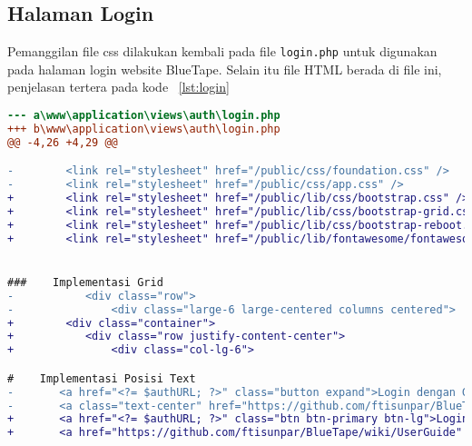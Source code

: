 \subsection{Halaman Login}
Pemanggilan file css dilakukan kembali pada file \texttt{login.php} untuk digunakan pada halaman login website BlueTape. Selain itu file HTML berada di file ini, penjelasan tertera pada kode ~\ref{lst:login}
\begin{lstlisting}[language=diff, caption=Perubahan file \path{\views\auth\login.php},  basicstyle=\ttfamily, frame=single,
columns=fullflexible, keepspaces=true, breaklines=true, label={lst:login}]
--- a\www\application\views\auth\login.php	
+++ b\www\application\views\auth\login.php	
@@ -4,26 +4,29 @@

-        <link rel="stylesheet" href="/public/css/foundation.css" />
-        <link rel="stylesheet" href="/public/css/app.css" />
+        <link rel="stylesheet" href="/public/lib/css/bootstrap.css" />
+        <link rel="stylesheet" href="/public/lib/css/bootstrap-grid.css" />
+        <link rel="stylesheet" href="/public/lib/css/bootstrap-reboot.css" />
+        <link rel="stylesheet" href="/public/lib/fontawesome/fontawesome.css" />


###    Implementasi Grid
-        	<div class="row">
-        		<div class="large-6 large-centered columns centered">
+        <div class="container">
+        	<div class="row justify-content-center">
+        		<div class="col-lg-6">

#    Implementasi Posisi Text
- 		<a href="<?= $authURL; ?>" class="button expand">Login dengan Google</a><br/><br/>
- 		<a class="text-center" href="https://github.com/ftisunpar/BlueTape/wiki/UserGuide" target="_blank">Petunjuk Penggunaan</a>
+ 		<a href="<?= $authURL; ?>" class="btn btn-primary btn-lg">Login dengan Google</a><br/><br/>
+ 		<a href="https://github.com/ftisunpar/BlueTape/wiki/UserGuide" target="_blank">Petunjuk Penggunaan</a>
\end{lstlisting}


